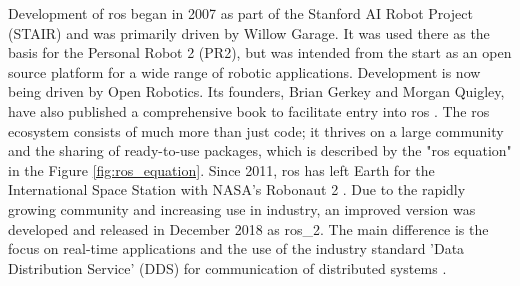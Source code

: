 Development of \gls{ros} began in 2007 as part of the Stanford AI Robot Project (STAIR) and was primarily driven by Willow Garage. It was used there as the basis for the Personal Robot 2 (PR2), but was intended from the start as an open source platform for a wide range of robotic applications. Development is now being driven by Open Robotics. Its founders, Brian Gerkey and Morgan Quigley, have also published a comprehensive book to facilitate entry into \gls{ros} \cite{quigley_programming_2015}. The \gls{ros} ecosystem consists of much more than just code; it thrives on a large community and the sharing of ready-to-use packages, which is described by the "\gls{ros} equation" in the Figure \ref{fig:ros_equation}. Since 2011, \gls{ros} has left Earth for the International Space Station with NASA's Robonaut 2 \cite{koubaa_ros_2016}. Due to the rapidly growing community and increasing use in industry, an improved version was developed and released in December 2018 as \gls{ros_2}. The main difference is the focus on real-time applications and the use of the industry standard 'Data Distribution Service' (DDS) for communication of distributed systems \cite{macenski_robot_2022}.

